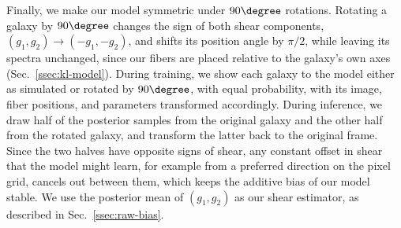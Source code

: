 Finally, we make our model symmetric under $90\degree$ rotations. Rotating a galaxy by $90\degree$ changes the sign of both shear components, $(g_1, g_2) \rightarrow (-g_1, -g_2)$, and shifts its position angle by $\pi/2$, while leaving its spectra unchanged, since our fibers are placed relative to the galaxy's own axes (Sec.~\ref{ssec:kl-model}). During training, we show each galaxy to the model either as simulated or rotated by $90\degree$, with equal probability, with its image, fiber positions, and parameters transformed accordingly. During inference, we draw half of the posterior samples from the original galaxy and the other half from the rotated galaxy, and transform the latter back to the original frame. Since the two halves have opposite signs of shear, any constant offset in shear that the model might learn, for example from a preferred direction on the pixel grid, cancels out between them, which keeps the additive bias of our model stable. We use the posterior mean of $(g_1, g_2)$ as our shear estimator, as described in Sec.~\ref{ssec:raw-bias}.

